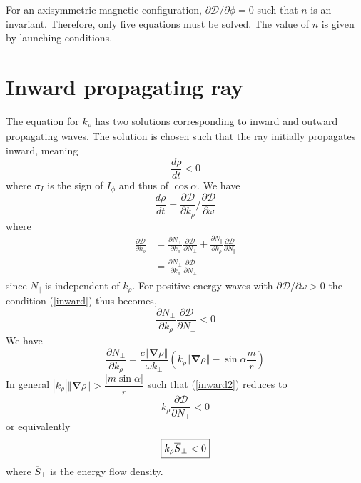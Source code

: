 \documentclass[a4paper,12pt]{article}%
\begin{document}
For an axisymmetric magnetic configuration, $\partial\mathcal{D}/\partial
\phi=0$ such that $n$ is an invariant. Therefore, only five equations must be
solved. The value of $n$ is given by launching conditions.

\section{Inward propagating ray}

The equation for $k_{\rho}$ has two solutions corresponding to inward and
outward propagating waves. The solution is chosen such that the ray initially
propagates inward, meaning
\begin{equation}
\frac{d\rho}{dt}<0\label{inward}%
\end{equation}
where $\sigma_{I}$ is the sign of $I_{\phi}$ and thus of $\cos\alpha$. We have%
\begin{equation}
\frac{d\rho}{dt}=\frac{\partial\mathcal{D}}{\partial k_{\rho}}/\frac
{\partial\mathcal{D}}{\partial\omega}%
\end{equation}
where%
\begin{align}
\frac{\partial\mathcal{D}}{\partial k_{\rho}} &  =\frac{\partial N_{\bot}%
}{\partial k_{\rho}}\frac{\partial\mathcal{D}}{\partial N_{\bot}}%
+\frac{\partial N_{\Vert}}{\partial k_{\rho}}\frac{\partial\mathcal{D}%
}{\partial N_{\Vert}}\\
&  =\frac{\partial N_{\bot}}{\partial k_{\rho}}\frac{\partial\mathcal{D}%
}{\partial N_{\bot}}%
\end{align}
since $N_{\Vert}$ is independent of $k_{\rho}$. For positive energy waves with
$\partial\mathcal{D}/\partial\omega>0$ the condition (\ref{inward}) thus
becomes,%
\begin{equation}
\frac{\partial N_{\bot}}{\partial k_{\rho}}\frac{\partial\mathcal{D}}{\partial
N_{\bot}}<0\label{inward2}%
\end{equation}
We have%
\begin{equation}
\frac{\partial N_{\bot}}{\partial k_{\rho}}=\dfrac{c\left\Vert \mathbf{\nabla
}\rho\right\Vert }{\omega k_{\bot}}\left(  k_{\rho}\left\Vert \mathbf{\nabla
}\rho\right\Vert -\sin\alpha\dfrac{m}{r}\right)
\end{equation}
In general $\left\vert k_{\rho}\right\vert \left\Vert \mathbf{\nabla}%
\rho\right\Vert >\dfrac{\left\vert m\sin\alpha\right\vert }{r}$ such that
(\ref{inward2}) reduces to%
\begin{equation}
k_{\rho}\frac{\partial\mathcal{D}}{\partial N_{\bot}}<0
\end{equation}
or equivalently%
\begin{equation}
\fbox{$k_{\rho}\overline{S}_{\bot}<0$}%
\end{equation}
where $\overline{S}_{\bot}$ is the energy flow density.
\end{document}

